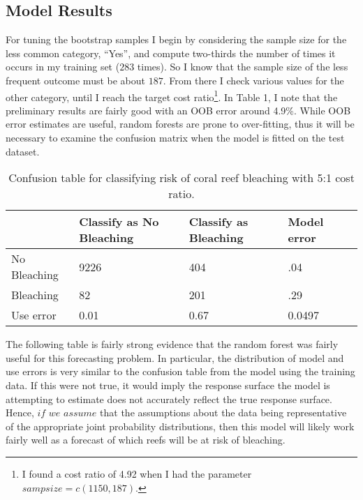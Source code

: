 \documentclass{article}
\begin{document}
\subsection{Model Results}

For tuning the bootstrap samples I begin by considering the sample size for the less common category, ``Yes'', and compute two-thirds the number of times it occurs in my training set ($283$ times). So I know that the sample size of the less frequent outcome must be about $187$. From there I check various values for the other category, until I reach the target cost ratio\footnote{I found a cost ratio of 4.92 when I had the parameter $\textit{sampsize}= c(1150, 187)$.}. In Table 1, I note that the preliminary results are fairly good with an OOB error around 4.9\%. While OOB error estimates are useful, random forests are prone to over-fitting, thus it will be necessary to examine the confusion matrix when the model is fitted on the test dataset. 



\begin{table}[!htb]
\centering
\label{random1}
\begin{tabular}{|l|ll|ll|}
\hline
          & Classify as No Bleaching & Classify as Bleaching & Model error &  \\
          \hline
No Bleaching     & 9226               & 404             &  .04      &  \\
 Bleaching       & 82                 & 201             &  .29      &  \\
\hline
Use error        & 0.01               & 0.67            & 0.0497    &  \\
\hline
\end{tabular}
\caption{Confusion table for classifying risk of coral reef bleaching with 5:1 cost ratio.}
\end{table}

The following table is fairly strong evidence that the random forest was fairly useful for this forecasting problem. In particular, the distribution of model and use errors is very similar to the confusion table from the model using the training data. If this were not true, it would imply the response surface the model is attempting to estimate does not accurately reflect the true response surface. Hence, $\textit{if we assume}$ that the assumptions about the data being representative of the appropriate joint probability distributions, then this model will likely work fairly well as a forecast of which reefs will be at risk of bleaching. 
\end{document}
